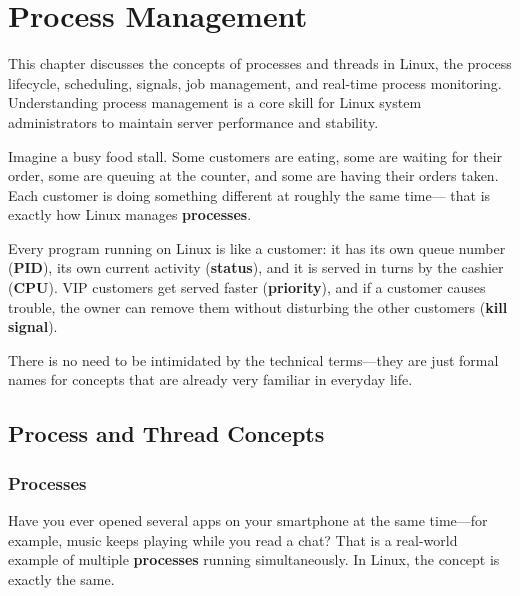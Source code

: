
\chapter{Process Management}
\label{ch:process-management}

This chapter discusses the concepts of processes and threads in Linux, the
process lifecycle, scheduling, signals, job management, and real-time process
monitoring. Understanding process management is a core skill for Linux system
administrators to maintain server performance and stability.

\begin{examplebox}
Imagine a busy food stall. Some customers are eating, some are waiting for
their order, some are queuing at the counter, and some are having their orders
taken. Each customer is doing something different at roughly the same time---
that is exactly how Linux manages \textbf{processes}.

Every program running on Linux is like a customer: it has its own queue number
(\textbf{PID}), its own current activity (\textbf{status}), and it is served
in turns by the cashier (\textbf{CPU}). VIP customers get served faster
(\textbf{priority}), and if a customer causes trouble, the owner can remove
them without disturbing the other customers (\textbf{kill signal}).

There is no need to be intimidated by the technical terms---they are just
formal names for concepts that are already very familiar in everyday life.
\end{examplebox}

\section{Process and Thread Concepts}
\label{sec:process-concept}

\subsection{Processes}

Have you ever opened several apps on your smartphone at the same time---for
example, music keeps playing while you read a chat? That is a real-world
example of multiple \textbf{processes} running simultaneously. In Linux, the
concept is exactly the same.

